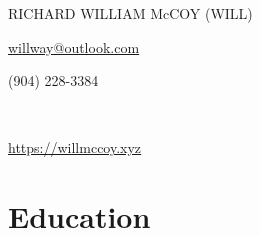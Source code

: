 \documentclass{article}
\newcommand\midtextbox[1]{%
  \parbox{.6\textwidth}{#1}%
}
\newcommand\outtextbox[1]{%
  \parbox{.2\textwidth}{#1}%
}
\newenvironment{TitleCenter}[1][\topsep]
  {\setlength{\topsep}{#1}\par\kern\topsep\centering}%
  {\par\kern\topsep}%
\begin{document}
\thispagestyle{empty}

\begin{TitleCenter}[0em]
\bfseries\huge

RICHARD WILLIAM McCOY (WILL)
\end{TitleCenter}
\noindent\outtextbox{\href{willway@outlook.com}{willway@outlook.com}\hfill}\midtextbox{\hfil%
\hfil}\outtextbox{\hfill (904) 228-3384} \\
\noindent\outtextbox{\href{https://willmccoy.xyz}{https://willmccoy.xyz}\hfill}\midtextbox{\hfil\hfil}\outtextbox{\hfill}


\vspace{-1.5em}
\section{Education}
\end{document}
